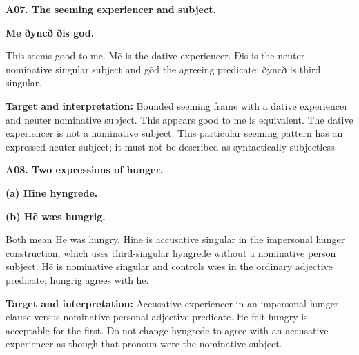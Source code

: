 \par\begin{minipage}{\linewidth}\raggedright
\textbf{A07. The seeming experiencer and subject.}

\textbf{Mē ðyncð ðis gōd.}

This seems good to me. Mē is the dative experiencer. Ðis is the neuter nominative singular subject and gōd the agreeing predicate; ðyncð is third singular.

\textbf{Target and interpretation:} Bounded seeming frame with a dative experiencer and neuter nominative subject. This appears good to me is equivalent. The dative experiencer is not a nominative subject. This particular seeming pattern has an expressed neuter subject; it must not be described as syntactically subjectless.

\end{minipage}\par\addvspace{4pt}

\par\begin{minipage}{\linewidth}\raggedright
\textbf{A08. Two expressions of hunger.}

\textbf{(a) Hine hyngrede.}

\textbf{(b) Hē wæs hungrig.}

Both mean He was hungry. Hine is accusative singular in the impersonal hunger construction, which uses third-singular hyngrede without a nominative person subject. Hē is nominative singular and controls wæs in the ordinary adjective predicate; hungrig agrees with hē.

\textbf{Target and interpretation:} Accusative experiencer in an impersonal hunger clause versus nominative personal adjective predicate. He felt hungry is acceptable for the first. Do not change hyngrede to agree with an accusative experiencer as though that pronoun were the nominative subject.

\end{minipage}\par\addvspace{4pt}

